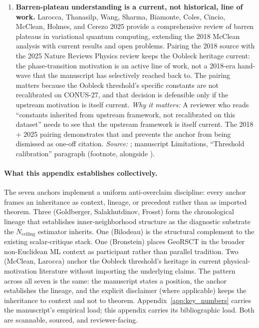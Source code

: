 \documentclass{article}
\begin{document}
\begin{enumerate}
\item \textbf{Barren-plateau understanding is a current, not historical, line of work.}
Larocca, Thanasilp, Wang, Sharma, Biamonte, Coles, Cincio, McClean, Holmes, and Cerezo 2025 provide a comprehensive review of barren plateaus in variational quantum computing, extending the 2018 McClean analysis with current results and open problems. Pairing the 2018 source with the 2025 Nature Reviews Physics review keeps the Oobleck heritage current: the phase-transition motivation is an active line of work, not a 2018-era hand-wave that the manuscript has selectively reached back to. The pairing matters because the Oobleck threshold's specific constants are not recalibrated on CONUS-27, and that decision is defensible only if the upstream motivation is itself current.
\emph{Why it matters:} A reviewer who reads ``constants inherited from upstream framework, not recalibrated on this dataset'' needs to see that the upstream framework is itself current. The 2018 + 2025 pairing demonstrates that and prevents the anchor from being dismissed as one-off citation.
\emph{Source:} \citet{larocca2025barren}; manuscript Limitations, ``Threshold calibration'' paragraph (footnote, alongside \citet{mcclean2018barren}).

\end{enumerate}

\paragraph{What this appendix establishes collectively.}
The seven anchors implement a uniform anti-overclaim discipline: every anchor frames an inheritance as context, lineage, or precedent rather than as imported theorem. Three (Goldberger, Salakhutdinov, Frosst) form the chronological lineage that establishes inner-neighborhood structure as the diagnostic substrate the $N_{\text{ceiling}}$ estimator inherits. One (Bilodeau) is the structural complement to the existing scalar-critique stack. One (Bronstein) places GeoRSCT in the broader non-Euclidean ML context as participant rather than parallel tradition. Two (McClean, Larocca) anchor the Oobleck threshold's heritage in current physical-motivation literature without importing the underlying claims. The pattern across all seven is the same: the manuscript states a position, the anchor establishes the lineage, and the explicit disclaimer (where applicable) keeps the inheritance to context and not to theorem. Appendix~\ref{app:key_numbers} carries the manuscript's empirical load; this appendix carries its bibliographic load. Both are scannable, sourced, and reviewer-facing.
\end{document}
